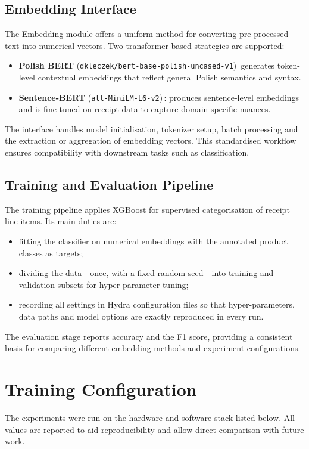 \documentclass{SGGW-thesis-EN}
\begin{document}
\subsection{Embedding Interface}
The Embedding module offers a uniform method for converting pre-processed text into numerical
vectors. Two transformer-based strategies are supported:

\begin{itemize}
  \item \textbf{Polish BERT} (\texttt{dkleczek/bert-base-polish-uncased-v1})\, generates token-level contextual embeddings
        that reflect general Polish semantics and syntax.
  \item \textbf{Sentence-BERT} (\texttt{all-MiniLM-L6-v2})\,: produces sentence-level embeddings and is fine-tuned on
        receipt data to capture domain-specific nuances.
\end{itemize}
\noindent The interface handles model initialisation, tokenizer setup, batch processing and the extraction or aggregation of
embedding vectors. This standardised workflow ensures compatibility with downstream tasks such as classification.


\subsection{Training and Evaluation Pipeline}
The training pipeline applies XGBoost for supervised categorisation of receipt line items. Its main duties are:
\begin{itemize}
  \item fitting the classifier on numerical embeddings with the annotated product classes as targets;
  \item dividing the data—once, with a fixed random seed—into training and validation subsets for hyper-parameter
        tuning;
  \item recording all settings in Hydra configuration files so that hyper-parameters, data paths and model options are
        exactly reproduced in every run.
\end{itemize}

The evaluation stage reports accuracy and the F1 score, providing a consistent basis for
comparing different embedding methods and experiment configurations.


\section{Training Configuration}
The experiments were run on the hardware and software stack listed below. All values are reported to aid reproducibility
and allow direct comparison with future work.
\end{document}

